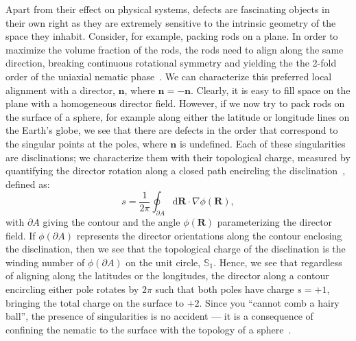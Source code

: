 Apart from their effect on physical systems, defects are fascinating objects in their own right as they are extremely sensitive to the intrinsic geometry of the space they inhabit.
Consider, for example, packing rods on a plane.
In order to maximize the volume fraction of the rods, the rods need to align along the same direction, breaking continuous rotational symmetry and yielding the the 2-fold order of the uniaxial nematic phase~\cite{RN204}.
We can characterize this preferred local alignment with a director, $\mathbf{n}$, where $\mathbf{n} = \mathbf{-n}$.
Clearly, it is easy to fill space on the plane with a homogeneous director field.
However, if we now try to pack rods on the surface of a sphere, for example along either the latitude or longitude lines on the Earth's globe, we see that there are defects in the order that correspond to the singular points at the poles, where $\mathbf{n}$ is undefined.
Each of these singularities are disclinations; we characterize them with their topological charge, measured by quantifying the director rotation along a closed path encircling the disclination~\cite{RN23,RN153,RN203}, defined as:
\begin{equation}
  s = \frac{1}{2 \pi}\oint_{\partial A} \textrm{d}\mathbf{R} \cdot \nabla\phi(\mathbf{R}),\label{eq:1-topCharge}
\end{equation}
with $\partial A$ giving the contour and the angle $\phi(\mathbf{R})$ parameterizing the director field.
If $\phi(\partial A)$ represents the director orientations along the contour enclosing the disclination, then we see that the topological charge of the disclination is the winding number of $\phi(\partial A)$ on the unit circle, $\mathbb{S}_1$.
Hence, we see that regardless of aligning along the latitudes or the longitudes, the director along a contour encircling either pole rotates by $2 \pi$ such that both poles have charge $s = +1$, bringing the total charge on the surface to $+2$.
Since you ``cannot comb a hairy ball'', the presence of singularities is no accident --- it is a consequence of confining the nematic to the surface with the topology of a sphere~\cite{RN209,RN169}.

